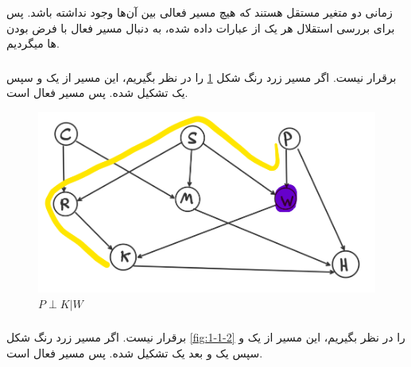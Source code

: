 \documentclass{university}
\begin{document}
\allowdisplaybreaks
\setupdocument

\section{}

\subsection{}
زمانی دو متغیر مستقل هستند که هیچ مسیر فعالی بین آن‌ها وجود نداشته باشد. 
پس برای بررسی استقلال هر یک از عبارات داده شده، به دنبال مسیر فعال با فرض 
بودن 
ها 
میگردیم. 

\subsubsection{}
برقرار نیست. اگر مسیر زرد رنگ شکل 
\ref{fig:1-1-1}
را در نظر بگیریم، این مسیر از یک 
و سپس یک 
تشکیل شده. پس مسیر فعال است. 

\begin{figure}
    \centering
    \includegraphics[width=\textwidth]{assets/1-1-1.png}
    \caption{$P \perp K | W$}
    \label{fig:1-1-1}
\end{figure}

\subsubsection{}
برقرار نیست. اگر مسیر زرد رنگ شکل 
\ref{fig:1-1-2}
را در نظر بگیریم، این مسیر از یک 
و سپس یک 
و بعد یک 
تشکیل شده. پس مسیر فعال است. 
\end{document}

